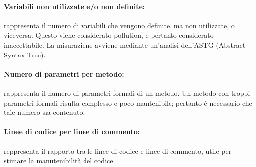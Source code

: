 \paragraph{Variabili non utilizzate e/o non definite:} rappresenta il numero di variabili che vengono definite, ma non utilizzate, o viceversa. Questo viene considerato pollution, e pertanto considerato inaccettabile. La misurazione avviene mediante un’analisi dell’ASTG (Abstract Syntax Tree).

\paragraph{Numero di parametri per metodo:} rappresenta il numero di parametri formali di un metodo. Un metodo con troppi parametri formali risulta complesso e poco mantenibile; pertanto è necessario che tale numero sia contenuto.

\paragraph{Linee di codice per linee di commento:} reppresenta il rapporto tra le linee di codice e linee di commento, utile per stimare la manutenibilità del codice.